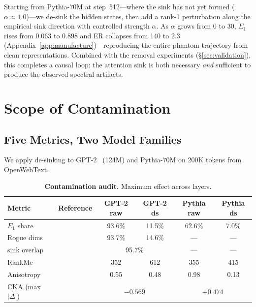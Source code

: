 \documentclass[11pt]{article}
\begin{document}
Starting from Pythia-70M at step~512---where the sink has not yet formed ($\alpha \approx 1.0$)---we de-sink the hidden states, then add a rank-1 perturbation along the empirical sink direction with controlled strength $\alpha$.
As $\alpha$ grows from 0 to 30, $E_1$ rises from 0.063 to 0.898 and ER collapses from 140 to 2.3 (Appendix~\ref{app:manufacture})---reproducing the entire phantom trajectory from clean representations.
Combined with the removal experiments (\S\ref{sec:validation}), this completes a causal loop: the attention sink is both necessary \emph{and} sufficient to produce the observed spectral artifacts.

\section{Scope of Contamination}\label{sec:scope}

\subsection{Five Metrics, Two Model Families}\label{sec:fivemetrics}

We apply de-sinking to GPT-2~\citep{radford2019language} (124M) and Pythia-70M on 200K tokens from OpenWebText.

\begin{table}[t]
\centering
\caption{\textbf{Contamination audit.} Maximum effect across layers.}
\label{tab:audit}
\small
\begin{tabular}{@{}llcccc@{}}
\toprule
\textbf{Metric} & \textbf{Reference} & \textbf{GPT-2 raw} & \textbf{GPT-2 ds} & \textbf{Pythia raw} & \textbf{Pythia ds} \\
\midrule
$E_1$ share & \citet{li2025tracing} & 93.6\% & 11.5\% & 62.6\% & 7.0\% \\
Rogue dims & \citet{timkey2021all} & 93.7\% & 14.6\% & --- & --- \\
\quad sink overlap & & \multicolumn{2}{c}{95.7\%} & --- & --- \\
RankMe & \citet{garrido2023rankme} & 352 & 612 & 355 & 415 \\
Anisotropy & \citet{ethayarajh2019contextual} & 0.55 & 0.48 & 0.98 & 0.13 \\
CKA (max $|\Delta|$) & \citet{raghu2021vision} & \multicolumn{2}{c}{$-0.569$} & \multicolumn{2}{c}{$+0.474$} \\
\bottomrule
\end{tabular}
\end{table}
\end{document}
